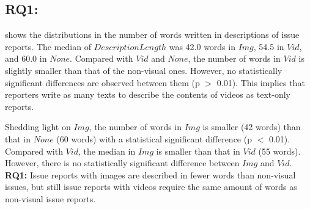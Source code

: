 % 



\subsection*{RQ1: \RQone{}}

 shows the distributions in the number of words written in descriptions of issue reports. The median of $DescriptionLength$ was 42.0 words in $Img$, 54.5 in $Vid$, and 60.0 in $None$. 
Compared with $Vid$ and $None$, the number of words in $Vid$ is slightly smaller than that of the non-visual ones. However, no statistically significant differences are observed between them (p $>$ 0.01). This implies that reporters write as many texts to describe the contents of videos as text-only reports. 

Shedding light on $Img$, the number of words in $Img$ is smaller (42 words) than 
that in $None$ (60 words) with a statistical significant difference (p $<$ 0.01). 
Compared with $Vid$, the median in $Img$ is smaller than that in $Vid$ (55 words). 
However, there is no statistically significant difference between $Img$ and $Vid$.%
\vspace{-0.2cm}%
\summarybox
{
{\bf RQ1: }{Issue reports with images are described in fewer words than non-visual issues, but still issue reports with videos require the same amount of words as non-visual issue reports. 
}}


